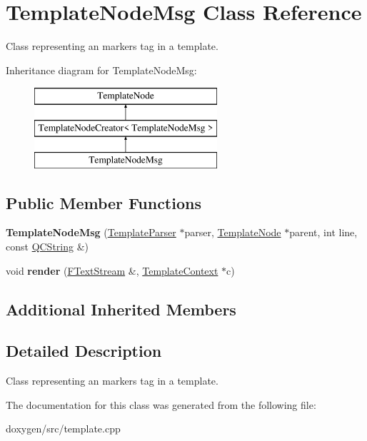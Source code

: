 \hypertarget{class_template_node_msg}{}\section{Template\+Node\+Msg Class Reference}
\label{class_template_node_msg}


Class representing an \textquotesingle{}markers\textquotesingle{} tag in a template.  


Inheritance diagram for Template\+Node\+Msg\+:\begin{figure}[H]
\begin{center}
\leavevmode
\includegraphics[height=3.000000cm]{class_template_node_msg}
\end{center}
\end{figure}
\subsection*{Public Member Functions}
\begin{DoxyCompactItemize}
\item 
\mbox{\label{class_template_node_msg_a725800e02f30c546f80c9d5aa1cacbc3}} 
{\bfseries Template\+Node\+Msg} (\mbox{\hyperlink{class_template_parser}{Template\+Parser}} $\ast$parser, \mbox{\hyperlink{class_template_node}{Template\+Node}} $\ast$parent, int line, const \mbox{\hyperlink{class_q_c_string}{Q\+C\+String}} \&)
\item 
\mbox{\label{class_template_node_msg_a70b0b8eb859351085eedd06b7259fd8a}} 
void {\bfseries render} (\mbox{\hyperlink{class_f_text_stream}{F\+Text\+Stream}} \&, \mbox{\hyperlink{class_template_context}{Template\+Context}} $\ast$c)
\end{DoxyCompactItemize}
\subsection*{Additional Inherited Members}


\subsection{Detailed Description}
Class representing an \textquotesingle{}markers\textquotesingle{} tag in a template. 

The documentation for this class was generated from the following file\+:\begin{DoxyCompactItemize}
\item 
doxygen/src/template.\+cpp\end{DoxyCompactItemize}
